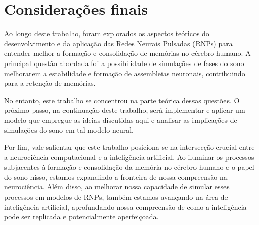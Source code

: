 \section{Considerações finais}

Ao longo deste trabalho, foram explorados os aspectos teóricos do desenvolvimento e da aplicação das Redes Neurais Pulsadas
(RNPs) para entender melhor a formação e consolidação de memórias no cérebro humano. A principal questão abordada foi a
possibilidade de simulações de fases do sono melhorarem a estabilidade e formação de assembleias neuronais, contribuindo para a
retenção de memórias. 

No entanto, este trabalho se concentrou na parte teórica dessas questões. O próximo passo, na continuação deste trabalho, será
implementar e aplicar um modelo que empregue as ideias discutidas aqui e analisar as implicações de simulações do sono em tal
modelo neural.

Por fim, vale salientar que este trabalho posiciona-se na intersecção crucial entre a neurociência computacional e a inteligência
artificial. Ao iluminar os processos subjacentes à formação e consolidação da memória no cérebro humano e o papel do sono nisso,
estamos expandindo a fronteira de nossa compreensão na neurociência. Além disso, ao melhorar nossa capacidade de simular esses
processos em modelos de RNPs, também estamos avançando na área de inteligência artificial, aprofundando nossa compreensão de como
a inteligência pode ser replicada e potencialmente aperfeiçoada. 

